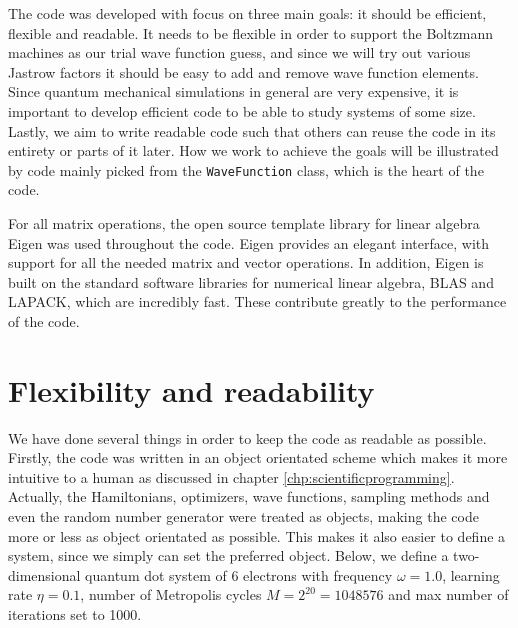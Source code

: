 The code was developed with focus on three main goals: it should be efficient, flexible and readable. It needs to be flexible in order to support the Boltzmann machines as our trial wave function guess, and since we will try out various Jastrow factors it should be easy to add and remove wave function elements. Since quantum mechanical simulations in general are very expensive, it is important to develop efficient code to be able to study systems of some size. Lastly, we aim to write readable code such that others can reuse the code in its entirety or parts of it later.  How we work to achieve the goals will be illustrated by code mainly picked from the \lstinline{WaveFunction} class, which is the heart of the code.

For all matrix operations, the open source template library for linear algebra Eigen was used throughout the code. Eigen provides an elegant interface, with support for all the needed matrix and vector operations. In addition, Eigen is built on the standard software libraries for numerical linear algebra, BLAS and LAPACK, which are incredibly fast. These contribute greatly to the performance of the code. 

\section{Flexibility and readability}
We have done several things in order to keep the code as readable as possible. Firstly, the code was written in an object orientated scheme which makes it more intuitive to a human as discussed in chapter \ref{chp:scientificprogramming}. Actually, the Hamiltonians, optimizers, wave functions, sampling methods and even the random number generator were treated as objects, making the code more or less as object orientated as possible. This makes it also easier to define a system, since we simply can set the preferred object. Below, we define a two-dimensional quantum dot system of 6 electrons with frequency $\omega=1.0$, learning rate $\eta=0.1$, number of Metropolis cycles $M=2^{20}=1048576$ and max number of iterations set to 1000.

